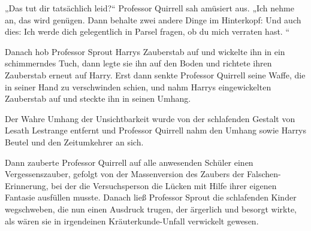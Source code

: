 „Das tut dir tatsächlich leid?“
Professor Quirrell sah amüsiert aus.
„Ich nehme an, das wird genügen. Dann behalte zwei andere Dinge im Hinterkopf:  Und auch dies: Ich werde dich gelegentlich in Parsel fragen, ob du mich verraten hast. “

\later

Danach hob Professor Sprout Harrys Zauberstab auf und wickelte ihn in ein schimmerndes Tuch, dann legte sie ihn auf den Boden und richtete ihren Zauberstab erneut auf Harry. Erst dann senkte Professor Quirrell seine Waffe, die in seiner Hand zu verschwinden schien, und nahm Harrys eingewickelten Zauberstab auf und steckte ihn in seinen Umhang.

Der Wahre Umhang der Unsichtbarkeit wurde von der schlafenden Gestalt von Lesath Lestrange entfernt und Professor Quirrell nahm den Umhang sowie Harrys Beutel und den Zeitumkehrer an sich.

Dann zauberte Professor Quirrell auf alle anwesenden Schüler einen Vergessenszauber, gefolgt von der Massenversion des Zaubers der Falschen-Erinnerung, bei der die Versuchsperson die Lücken mit Hilfe ihrer eigenen Fantasie ausfüllen musste. Danach ließ Professor Sprout die schlafenden Kinder wegschweben, die nun einen Ausdruck trugen, der ärgerlich und besorgt wirkte, als wären sie in irgendeinen Kräuterkunde-Unfall verwickelt gewesen.

